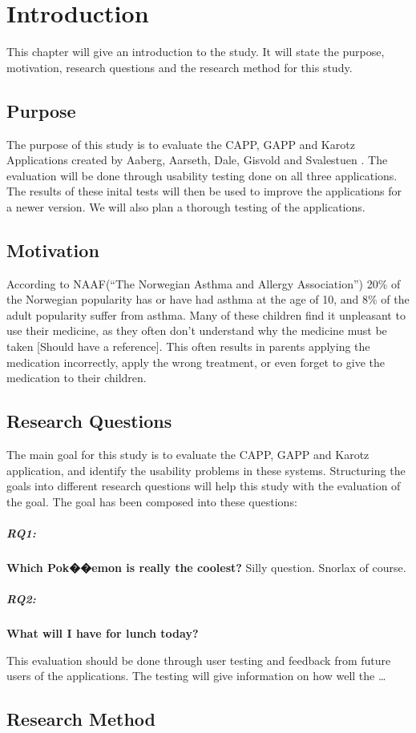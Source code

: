 \chapter{Introduction}
\label{introduction}

This chapter will give an introduction to the study. It will state the purpose, motivation, research questions and the research method for this study. 

\section{Purpose}
\label{purpose}
The purpose of this study is to evaluate the CAPP, GAPP and Karotz Applications created by Aaberg, Aarseth, Dale, Gisvold and Svalestuen \cite{CustomerDriven}.
The evaluation will be done through usability testing done on all three applications. The results of these inital tests will then be used to improve the applications for a newer version. 
We will also plan a thorough testing of the applications.


\section{Motivation}
\label{motivation}
According to NAAF(``The Norwegian Asthma and Allergy Association'') 20\% of the Norwegian popularity has or have had asthma at the age of 10, and 8\% of the adult popularity suffer from asthma. Many of these children find it unpleasant to use their medicine, as they often don't understand why the medicine must be taken [Should have a reference]. This often results in parents applying the medication incorrectly, apply the wrong treatment, or even forget to give the medication to their children. 


\section{Research Questions}
\label{reseachquestions}
The main goal for this study is to evaluate the CAPP, GAPP and Karotz application, and identify the usability problems in these systems. Structuring the goals into different research questions will help this study with the evaluation of the goal. The goal has been composed into these questions:

\paragraph{RQ1:}
\textbf{Which Pok��emon is really the coolest?}
Silly question. Snorlax of course. 

\paragraph{RQ2:}
\textbf{What will I have for lunch today?}

This evaluation should be done through user testing and feedback from future users of the applications. The testing will give information on how well the 
\ldots

\section{Research Method}
\label{researchmethod}


